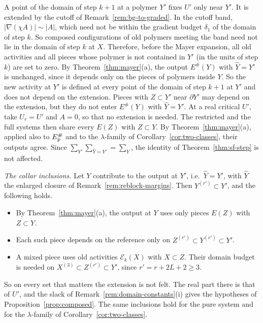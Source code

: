 \begin{remark}\label{rem:extension}
A point of the domain of step $k+1$ at a polymer $Y'$ fixes $U'$ only near $Y'$. It is extended by the cutoff of Remark~\ref{rem:bg-to-graded}. In the cutoff band, $|\nabla(\chi A)|\sim|A|$, which need not be within the gradient budget $\delta_1$ of the domain of step $k$. So composed configurations of old polymers meeting the band need not lie in the domain of step $k$ at $X$. Therefore, before the Mayer expansion, all old activities and all pieces whose polymer is not contained in $Y'$ (in the units of step $k$) are set to zero. By Theorem~\ref{thm:mayer}(a), the output $E^\#(Y)$ with $\hat Y=Y'$ is unchanged, since it depends only on the pieces of polymers inside $Y$. So the new activity at $Y'$ is defined at every point of the domain of step $k+1$ at $Y'$ and does not depend on the extension. Pieces with $Z\subset Y'$ near $\partial Y'$ may depend on the extension, but they do not enter $E^\#(Y)$ with $\hat Y=Y'$. At a real critical $U'$, take $U_r=U'$ and $A=0$, so that no extension is needed. The restricted and the full systems then share every $E(Z)$ with $Z\subset Y$. By Theorem~\ref{thm:mayer}(a), applied also to $E^\#_{\rm p}$ and to the $\lambda$-family of Corollary~\ref{cor:two-classes}, their outputs agree. Since $\sum_{Y'}\sum_{\hat Y=Y'}=\sum_Y$, the identity of Theorem~\ref{thm:sf-step} is not affected.

\emph{The collar inclusions.} Let $Y$ contribute to the output at $Y'$, i.e.\ $\hat Y=Y'$, with $\hat Y$ the enlarged closure of Remark~\ref{rem:reblock-margins}. Then $Y^{(r')}\subset Y'$, and the following holds.
\begin{itemize}
\item By Theorem~\ref{thm:mayer}(a), the output at $Y$ uses only pieces $E(Z)$ with $Z\subset Y$.
\item Each such piece depends on the reference only on $Z^{(r')}\subset Y^{(r')}\subset Y'$.
\item A mixed piece uses old activities $\mathcal E_k(X)$ with $X\subset Z$. Their domain budget is needed on $X^{(3)}\subset Z^{(r')}\subset Y'$, since $r'=r+2L+2\ge3$.
\end{itemize}
So on every set that matters the extension is not felt. The real part there is that of $U'$, and the slack of Remark~\ref{rem:domain-constants}(i) gives the hypotheses of Proposition~\ref{prop:composed}. The same inclusions hold for the pure system and for the $\lambda$-family of Corollary~\ref{cor:two-classes}.


\end{remark}
